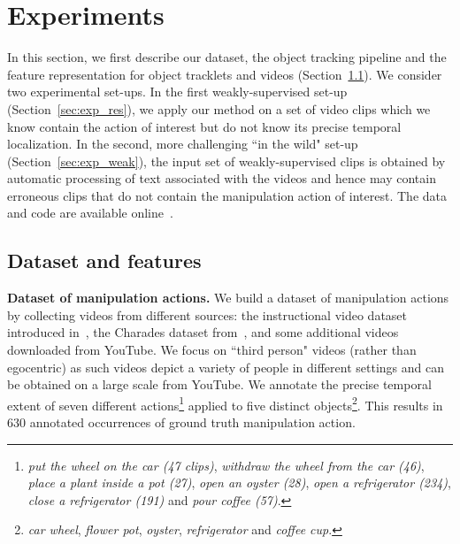 \section{Experiments}
\label{sec:experiments}

In this section, we first describe our dataset, the object tracking pipeline and the feature representation for object tracklets and videos (Section~\ref{sec:dataset}). 
We consider two experimental set-ups. 
In the first weakly-supervised set-up (Section~\ref{sec:exp_res}), we apply our method on a set of video clips which we know contain the action of interest but do not know its precise temporal localization. 
In the second, more challenging ``in the wild" set-up (Section~\ref{sec:exp_weak}), the input set of weakly-supervised clips is obtained by automatic processing of text associated with the videos and hence may contain erroneous clips that do not contain the manipulation action of interest.         
The data and code are available online~\cite{Alayrac16ObjectStatesWeb}. 
%
%
%
%
%


\subsection{Dataset and features}
\label{sec:dataset}

%
%
%
%
%
%
\noindent\textbf{Dataset of manipulation actions.}
We build a dataset of manipulation actions by collecting videos from different sources: the instructional video dataset introduced in~\cite{Alayrac15Unsupervised}, the Charades dataset from~\cite{varol16hollywood}, and some additional videos downloaded from YouTube. We focus on ``third person" videos (rather than egocentric) as such videos depict a variety of people in different settings and can be obtained on a large scale from YouTube.
We annotate the precise temporal extent of seven different actions\footnote{\textit{put the wheel on the car (47 clips)}, \textit{withdraw the wheel from the car (46)}, \textit{place a plant inside a pot (27)}, \textit{open an oyster (28)}, \textit{open a refrigerator (234)}, \textit{close a refrigerator (191)} and \textit{pour coffee (57)}.} applied to five distinct objects\footnote{\textit{car wheel}, \textit{flower pot}, \textit{oyster}, \textit{refrigerator} and \textit{coffee cup}.}. 
This results in 630 annotated occurrences of ground truth manipulation action. 

